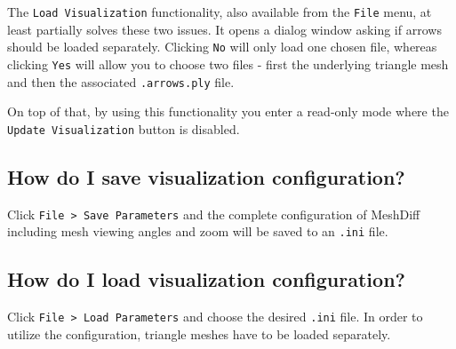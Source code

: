 The \verb+Load Visualization+ functionality, also available from the \verb+File+ menu, at least partially solves these two issues. It opens a dialog window asking if arrows should be loaded separately. Clicking \verb+No+ will only load one chosen file, whereas clicking \verb+Yes+ will allow you to choose two files - first the underlying triangle mesh and then the associated \verb+.arrows.ply+ file.

On top of that, by using this functionality you enter a read-only mode where the \verb+Update Visualization+ button is disabled.

\subsection{How do I save visualization configuration?}

Click \verb+File > Save Parameters+ and the complete configuration of MeshDiff including mesh viewing angles and zoom will be saved to an \verb+.ini+ file.

\subsection{How do I load visualization configuration?}

Click \verb+File > Load Parameters+ and choose the desired \verb+.ini+ file. In order to utilize the configuration, triangle meshes have to be loaded separately.